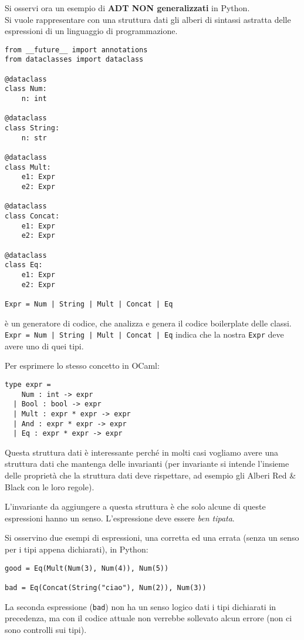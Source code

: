 \documentclass{article}
\begin{document}
Si osservi ora un esempio di \textbf{ADT NON generalizzati} in Python.\\
Si vuole rappresentare con una struttura dati gli alberi di sintassi astratta delle espressioni di un linguaggio di programmazione.
\begin{tcolorbox}
\begin{verbatim}
from __future__ import annotations
from dataclasses import dataclass

@dataclass
class Num:
    n: int

@dataclass
class String:
    n: str

@dataclass
class Mult:
    e1: Expr
    e2: Expr

@dataclass
class Concat:
    e1: Expr
    e2: Expr

@dataclass
class Eq:
    e1: Expr
    e2: Expr

Expr = Num | String | Mult | Concat | Eq
\end{verbatim}
\end{tcolorbox}
\texttt{\@dataclass} è un generatore di codice, che analizza e genera il codice boilerplate delle classi.\\
\texttt{Expr = Num | String | Mult | Concat | Eq} indica che la nostra \texttt{Expr} deve avere uno di quei tipi.

Per esprimere lo stesso concetto in OCaml:
\begin{tcolorbox}
\begin{verbatim}
type expr =
    Num : int -> expr
  | Bool : bool -> expr
  | Mult : expr * expr -> expr
  | And : expr * expr -> expr
  | Eq : expr * expr -> expr
\end{verbatim}
\end{tcolorbox}

Questa struttura dati è interessante perché in molti casi vogliamo avere una struttura dati che mantenga delle invarianti (per invariante si intende l'insieme delle proprietà che la struttura dati deve rispettare, ad esempio gli Alberi Red \& Black con le loro regole).

L'invariante da aggiungere a questa struttura è che solo alcune di queste espressioni hanno un senso. L'espressione deve essere \textit{ben tipata}.

Si osservino due esempi di espressioni, una corretta ed una errata (senza un senso per i tipi appena dichiarati), in Python:
\begin{tcolorbox}
\begin{verbatim}
good = Eq(Mult(Num(3), Num(4)), Num(5))

bad = Eq(Concat(String("ciao"), Num(2)), Num(3))
\end{verbatim}
\end{tcolorbox}
La seconda espressione (\texttt{bad}) non ha un senso logico dati i tipi dichiarati in precedenza, ma con il codice attuale non verrebbe sollevato alcun errore (non ci sono controlli sui tipi).
\end{document}
